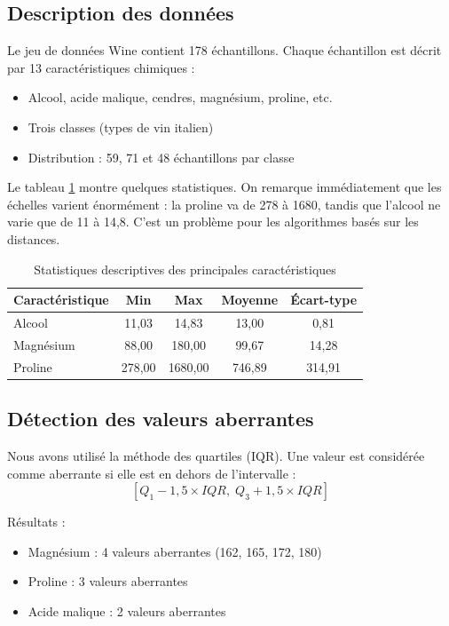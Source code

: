 \documentclass[conference]{IEEEtran}
\begin{document}
\subsection{Description des données}

Le jeu de données Wine \cite{uci_wine} contient 178 échantillons. Chaque échantillon est décrit par 13 caractéristiques chimiques :
\begin{itemize}
    \item Alcool, acide malique, cendres, magnésium, proline, etc.
    \item Trois classes (types de vin italien)
    \item Distribution : 59, 71 et 48 échantillons par classe
\end{itemize}

Le tableau \ref{tab:stats} montre quelques statistiques. On remarque immédiatement que les échelles varient énormément : la proline va de 278 à 1680, tandis que l'alcool ne varie que de 11 à 14,8. C'est un problème pour les algorithmes basés sur les distances.

\begin{table}[!t]
\centering
\caption{Statistiques descriptives des principales caractéristiques}
\begin{tabular}{|l|c|c|c|c|}
\hline
\textbf{Caractéristique} & \textbf{Min} & \textbf{Max} & \textbf{Moyenne} & \textbf{Écart-type} \\
\hline
Alcool & 11,03 & 14,83 & 13,00 & 0,81 \\
Magnésium & 88,00 & 180,00 & 99,67 & 14,28 \\
Proline & 278,00 & 1680,00 & 746,89 & 314,91 \\
\hline
\end{tabular}
\label{tab:stats}
\end{table}

\subsection{Détection des valeurs aberrantes}

Nous avons utilisé la méthode des quartiles (IQR). Une valeur est considérée comme aberrante si elle est en dehors de l'intervalle :
\[
[Q_1 - 1,5 \times IQR, \; Q_3 + 1,5 \times IQR]
\]

Résultats :
\begin{itemize}
    \item Magnésium : 4 valeurs aberrantes (162, 165, 172, 180)
    \item Proline : 3 valeurs aberrantes
    \item Acide malique : 2 valeurs aberrantes
\end{itemize}
\end{document}
